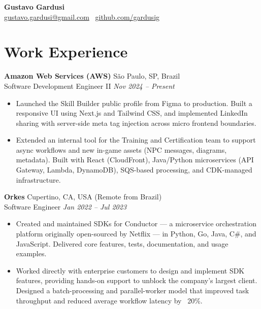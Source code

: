\documentclass[a4paper,10pt]{article}
\begin{document}
\begin{center}
    {\LARGE \textbf{Gustavo Gardusi}} \\ \vspace{0.5em}
    \href{mailto:gustavo.gardusi@gmail.com}{gustavo.gardusi@gmail.com} \textbar\ \href{https://github.com/gardusig}{github.com/gardusig}
\end{center}

\section*{Work Experience}

\textbf{Amazon Web Services (AWS)}
    \hfill São Paulo, SP, Brazil 
    \\ Software Development Engineer II 
    \hfill \textit{Nov 2024 – Present}
\begin{itemize}
    \item Launched the Skill Builder public profile from Figma to production. Built a responsive UI using Next.js and Tailwind CSS, and implemented LinkedIn sharing with server-side meta tag injection across micro frontend boundaries.
    \item Extended an internal tool for the Training and Certification team to support async workflows and new in-game assets (NPC messages, diagrams, metadata). Built with React (CloudFront), Java/Python microservices (API Gateway, Lambda, DynamoDB), SQS-based processing, and CDK-managed infrastructure.
\end{itemize}

\textbf{Orkes}
    \hfill Cupertino, CA, USA (Remote from Brazil)
    \\ Software Engineer
    \hfill \textit{Jan 2022 – Jul 2023}
\begin{itemize}
    \item Created and maintained SDKs for Conductor — a microservice orchestration platform originally open-sourced by Netflix — in Python, Go, Java, C\#, and JavaScript. Delivered core features, tests, documentation, and usage examples.
    \item Worked directly with enterprise customers to design and implement SDK features, providing hands-on support to unblock the company’s largest client. Designed a batch-processing and parallel-worker model that improved task throughput and reduced average workflow latency by ~20\%.
\end{itemize}
\end{document}
